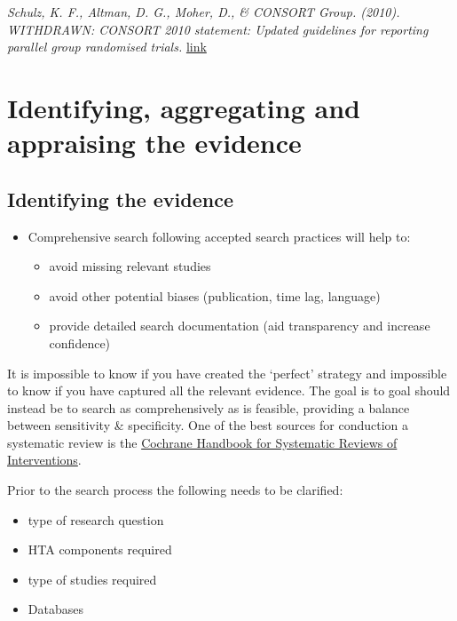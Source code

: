 \documentclass[
]{book}
\providecommand{\tightlist}{%
  \setlength{\itemsep}{0pt}\setlength{\parskip}{0pt}}
\begin{document}
\emph{Schulz, K. F., Altman, D. G., Moher, D., \& CONSORT Group. (2010). WITHDRAWN: CONSORT 2010 statement: Updated guidelines for reporting parallel group randomised trials.} \href{https://www.bmj.com/content/340/bmj.c332}{link}

\hypertarget{identifying-aggregating-and-appraising-the-evidence}{%
\section{Identifying, aggregating and appraising the evidence}\label{identifying-aggregating-and-appraising-the-evidence}}

\hypertarget{identifying-the-evidence}{%
\subsection{Identifying the evidence}\label{identifying-the-evidence}}

\begin{itemize}
\tightlist
\item
  Comprehensive search following accepted search practices will help to:

  \begin{itemize}
  \tightlist
  \item
    avoid missing relevant studies
  \item
    avoid other potential biases (publication, time lag, language)
  \item
    provide detailed search documentation (aid transparency and increase confidence)
  \end{itemize}
\end{itemize}

It is impossible to know if you have created the `perfect' strategy and impossible to know if you have captured all the relevant evidence. The goal is to goal should instead be to search as comprehensively as is feasible, providing a balance between sensitivity \& specificity. One of the best sources for conduction a systematic review is the \href{https://training.cochrane.org/handbook}{Cochrane Handbook for Systematic Reviews of Interventions}.

Prior to the search process the following needs to be clarified:

\begin{itemize}
\tightlist
\item
  type of research question
\item
  HTA components required
\item
  type of studies required
\item
  Databases
\end{itemize}
\end{document}
